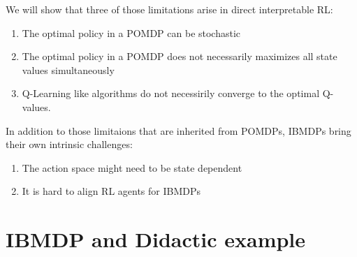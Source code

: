We will show that three of those limitations arise in direct interpretable RL:
\begin{enumerate}
    \item The optimal policy in a POMDP can be stochastic
    \item The optimal policy in a POMDP does not necessarily maximizes all state values simultaneously
    \item Q-Learning like algorithms do not necessirily converge to the optimal Q-values.
\end{enumerate}

In addition to those limitaions that are inherited from POMDPs, IBMDPs bring their own intrinsic challenges:
\begin{enumerate}
    \item The action space might need to be state dependent
    \item It is hard to align RL agents for IBMDPs
\end{enumerate}

\section{IBMDP and Didactic example}